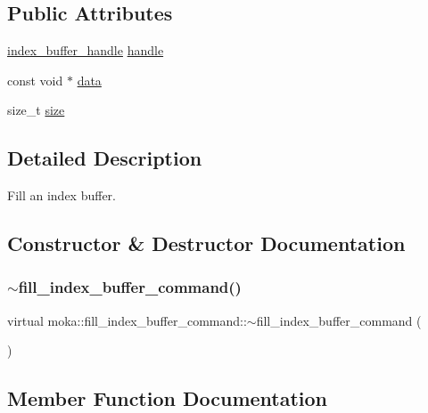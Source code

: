 \subsection*{Public Attributes}
\begin{DoxyCompactItemize}
\item 
\mbox{\hyperlink{structmoka_1_1index__buffer__handle}{index\+\_\+buffer\+\_\+handle}} \mbox{\hyperlink{classmoka_1_1fill__index__buffer__command_a436152e12a1013d8e33208793b875f8a}{handle}}
\item 
const void $\ast$ \mbox{\hyperlink{classmoka_1_1fill__index__buffer__command_ab82dcdae72665ef253acfdc34bd69e56}{data}}
\item 
size\+\_\+t \mbox{\hyperlink{classmoka_1_1fill__index__buffer__command_a08c9fa00714604bcd18e6b49b6b93974}{size}}
\end{DoxyCompactItemize}


\subsection{Detailed Description}
Fill an index buffer. 

\subsection{Constructor \& Destructor Documentation}
\mbox{\label{classmoka_1_1fill__index__buffer__command_a1d80fc9790fa6bfd3962c88f69034ee6}} 
\subsubsection{\texorpdfstring{$\sim$fill\_index\_buffer\_command()}{~fill\_index\_buffer\_command()}}
{\footnotesize\ttfamily virtual moka\+::fill\+\_\+index\+\_\+buffer\+\_\+command\+::$\sim$fill\+\_\+index\+\_\+buffer\+\_\+command (\begin{DoxyParamCaption}{ }\end{DoxyParamCaption})\hspace{0.3cm}{\ttfamily [virtual]}}



\subsection{Member Function Documentation}
\mbox{\label{classmoka_1_1fill__index__buffer__command_aff2bfc0447ac04a037fb0626a93a81c6}} 
